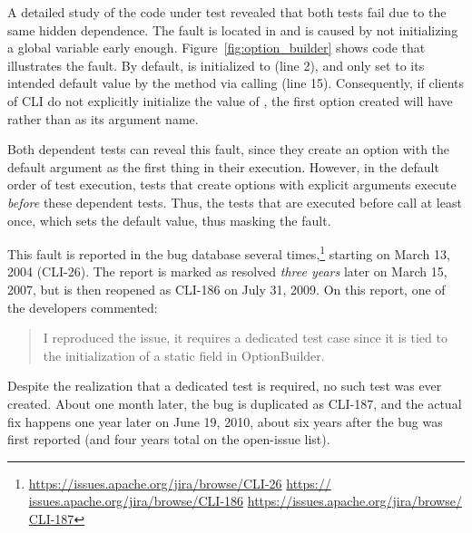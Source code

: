A detailed study of the code under test revealed that both 
tests fail due to the same hidden dependence. The fault is located in 
 and is caused by not initializing a global
variable early enough.
Figure~\ref{fig:option_builder} shows code that
illustrates the fault. 
%
By default,
 is initialized to  (line 2), and only set to
its intended default value  by the  method
via calling  (line 15). 
Consequently, if clients of CLI do not explicitly initialize the value of
, the first option created will have  rather
than  as its argument name.

Both dependent tests
can reveal this fault, since they create an option with 
the default argument as the first thing in their execution. However,
in the default order of test execution, 
tests that create options with explicit arguments execute \emph{before} 
these dependent tests.
Thus, the tests that are executed before call  at least once, which
sets the default  value, thus masking the fault.


This fault is reported in the bug
database several times,\footnote{\url{https://issues.apache.org/jira/browse/CLI-26} \url{https://
issues.apache.org/jira/browse/CLI-186} \url{https://issues.apache.org/jira/browse/
CLI-187}} starting on March 13, 2004 (CLI-26). The report is marked as resolved
\emph{three years} later on March 15, 2007, but is then reopened as CLI-186 on
July 31, 2009. On this report, one of the developers commented:
\begin{quote}
I reproduced the issue, it requires a dedicated test case since it is tied to the initialization 
of a static field in OptionBuilder.
\end{quote}
Despite the realization that a dedicated test is required, no such
test was ever created.
About one month later, the bug is duplicated as CLI-187, and the
actual fix happens one 
year later on June 19, 2010, about six years after the bug was first reported (and four years
total on the open-issue list).

